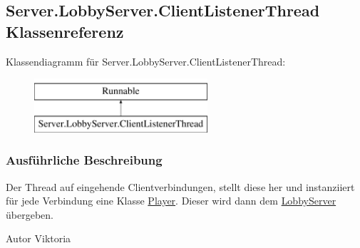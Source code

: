 \hypertarget{a00011}{\subsection{Server.\-Lobby\-Server.\-Client\-Listener\-Thread Klassenreferenz}
\label{a00011}
}
Klassendiagramm für Server.\-Lobby\-Server.\-Client\-Listener\-Thread\-:\begin{figure}[H]
\begin{center}
\leavevmode
\includegraphics[height=2.000000cm]{a00011}
\end{center}
\end{figure}


\subsubsection{Ausführliche Beschreibung}
Der Thread auf eingehende Clientverbindungen, stellt diese her und instanziiert für jede Verbindung eine Klasse \hyperlink{a00073}{Player}. Dieser wird dann dem \hyperlink{a00054}{Lobby\-Server} übergeben. \begin{DoxyAuthor}{Autor}
Viktoria 
\end{DoxyAuthor}
